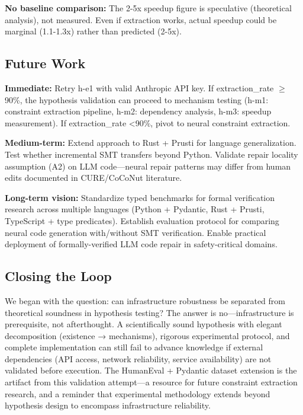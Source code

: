 \textbf{No baseline comparison:} The 2-5x speedup figure is speculative (theoretical analysis), not measured. Even if extraction works, actual speedup could be marginal (1.1-1.3x) rather than predicted (2-5x).

\subsection{Future Work}

\textbf{Immediate:} Retry h-e1 with valid Anthropic API key. If extraction\_rate $\geq$90\%, the hypothesis validation can proceed to mechanism testing (h-m1: constraint extraction pipeline, h-m2: dependency analysis, h-m3: speedup measurement). If extraction\_rate <90\%, pivot to neural constraint extraction.

\textbf{Medium-term:} Extend approach to Rust + Prusti for language generalization. Test whether incremental SMT transfers beyond Python. Validate repair locality assumption (A2) on LLM code---neural repair patterns may differ from human edits documented in CURE/CoCoNut literature.

\textbf{Long-term vision:} Standardize typed benchmarks for formal verification research across multiple languages (Python + Pydantic, Rust + Prusti, TypeScript + type predicates). Establish evaluation protocol for comparing neural code generation with/without SMT verification. Enable practical deployment of formally-verified LLM code repair in safety-critical domains.

\subsection{Closing the Loop}

We began with the question: can infrastructure robustness be separated from theoretical soundness in hypothesis testing? The answer is no---infrastructure is prerequisite, not afterthought. A scientifically sound hypothesis with elegant decomposition (existence → mechanisms), rigorous experimental protocol, and complete implementation can still fail to advance knowledge if external dependencies (API access, network reliability, service availability) are not validated before execution. The HumanEval + Pydantic dataset extension is the artifact from this validation attempt---a resource for future constraint extraction research, and a reminder that experimental methodology extends beyond hypothesis design to encompass infrastructure reliability.

